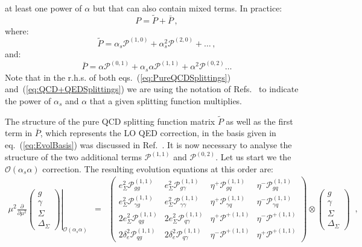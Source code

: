at least one power of $\alpha$ but that can also contain mixed
terms. In practice:
\begin{equation}
P = \widetilde{P} + \bar{P}\,,
\end{equation}
where:
\begin{equation}\label{eq:PureQCDSplittings}
\widetilde{P} = \alpha_s \mathcal{P}^{(1,0)} + \alpha_s^2 \mathcal{P}^{(2,0)}+\dots\,,
\end{equation}
and:
\begin{equation}\label{eq:QCD+QEDSplittings}
\bar{P} = \alpha \mathcal{P}^{(0,1)} + \alpha_s\alpha \mathcal{P}^{(1,1)}+\alpha^2 \mathcal{P}^{(0,2)}\dots
\end{equation}
Note that in the r.h.s. of both eqs.~(\ref{eq:PureQCDSplittings})
and~(\ref{eq:QCD+QEDSplittings}) we are using the notation of
Refs.~\cite{deFlorian:2015ujt,deFlorian:2016gvk} to indicate the power
of $\alpha_s$ and $\alpha$ that a given splitting function multiplies.

The structure of the pure QCD splitting function matrix
$\widetilde{P}$ as well as the first term in $\bar{P}$, which
represents the LO QED correction, in the basis given in
eq.~(\ref{eq:EvolBasis}) was discussed in
Ref.~\cite{Bertone:2015lqa}. It is now necessary to analyse the
structure of the two additional terms $\mathcal{P}^{(1,1)}$ and
$\mathcal{P}^{(0,2)}$. Let us start we the
$\mathcal{O}(\alpha_s\alpha)$ correction. The resulting evolution
equations at this order are:
\begin{equation}
\begin{array}{rcl}
\displaystyle\left.\mu^2\frac{\partial}{\partial \mu^2}
\begin{pmatrix}
g\\
\gamma\\
\Sigma\\
\Delta_\Sigma
\end{pmatrix}
\right|_{\mathcal{O}(\alpha_s \alpha)} &=& \displaystyle \begin{pmatrix}
e_\Sigma^2 \mathcal{P}^{(1,1)}_{gg}      & e_\Sigma^2 \mathcal{P}^{(1,1)}_{g\gamma} & \eta^+\mathcal{P}^{(1,1)}_{gq} & \eta^-\mathcal{P}^{(1,1)}_{gq} \\
e_\Sigma^2 \mathcal{P}^{(1,1)}_{\gamma g} & e_\Sigma^2 \mathcal{P}^{(1,1)}_{\gamma\gamma} & \eta^+\mathcal{P}^{(1,1)}_{\gamma q} &\eta^-\mathcal{P}^{(1,1)}_{\gamma q} \\
2 e_\Sigma^2 \mathcal{P}^{(1,1)}_{qg}    & 2 e_\Sigma^2 \mathcal{P}^{(1,1)}_{q\gamma} & \eta^+\mathcal{P}^{+(1,1)}  & \eta^-\mathcal{P}^{+(1,1)}\\
2 \delta_e^2 \mathcal{P}^{(1,1)}_{qg} & 2 \delta_e^2 \mathcal{P}^{(1,1)}_{q\gamma} &\eta^-\mathcal{P}^{+(1,1)} &\eta^+\mathcal{P}^{+(1,1)}
\end{pmatrix}\otimes
\begin{pmatrix}
g\\
\gamma\\
\Sigma\\
\Delta_\Sigma
\end{pmatrix}
\end{array}\,,
\end{equation}

